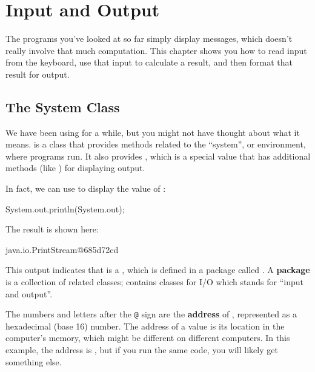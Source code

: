 \chapter{Input and Output}

The programs you've looked at so far simply display messages, which doesn't really involve that much computation.
This chapter shows you how to read input from the keyboard, use that input to calculate a result, and then format that result for output.


\section{The System Class}


We have been using  for a while, but you might not have thought about what it means.
 is a class that provides methods related to the ``system'', or environment, where programs run.
It also provides , which is a special value that has additional methods (like ) for displaying output.


In fact, we can use  to display the value of :

\begin{code}
System.out.println(System.out);
\end{code}

The result is shown here:

\begin{stdout}
java.io.PrintStream@685d72cd
\end{stdout}


This output indicates that  is a , which is defined in a package called .
A {\bf package} is a collection of related classes;  contains classes for I/O which stands for ``input and output''.


The numbers and letters after the {\tt @} sign are the {\bf address} of , represented as a hexadecimal (base 16) number.
The address of a value is its location in the computer's memory, which might be different on different computers.
In this example, the address is , but if you run the same code, you will likely get something else.

